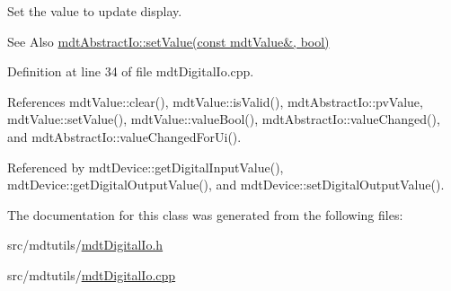 Set the value to update display. 

\begin{DoxySeeAlso}{See Also}
\hyperlink{classmdt_abstract_io_a3f5fc9ed13c2ec2aad0987cd15d95e31}{mdt\-Abstract\-Io\-::set\-Value(const mdt\-Value\&, bool)} 
\end{DoxySeeAlso}


Definition at line 34 of file mdt\-Digital\-Io.\-cpp.



References mdt\-Value\-::clear(), mdt\-Value\-::is\-Valid(), mdt\-Abstract\-Io\-::pv\-Value, mdt\-Value\-::set\-Value(), mdt\-Value\-::value\-Bool(), mdt\-Abstract\-Io\-::value\-Changed(), and mdt\-Abstract\-Io\-::value\-Changed\-For\-Ui().



Referenced by mdt\-Device\-::get\-Digital\-Input\-Value(), mdt\-Device\-::get\-Digital\-Output\-Value(), and mdt\-Device\-::set\-Digital\-Output\-Value().



The documentation for this class was generated from the following files\-:\begin{DoxyCompactItemize}
\item 
src/mdtutils/\hyperlink{mdt_digital_io_8h}{mdt\-Digital\-Io.\-h}\item 
src/mdtutils/\hyperlink{mdt_digital_io_8cpp}{mdt\-Digital\-Io.\-cpp}\end{DoxyCompactItemize}
